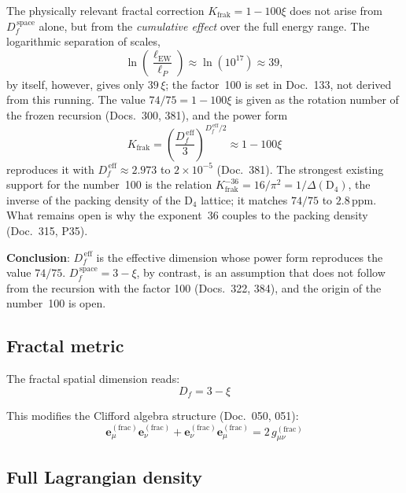 The physically relevant fractal correction $K_{\text{frak}} = 1 - 100\xi$
does not arise from $D_f^{\,\text{space}}$ alone, but from the
\emph{cumulative effect} over the full energy range. The logarithmic
separation of scales,
\begin{equation}
    \ln\!\left(\frac{\ell_{\text{EW}}}{\ell_P}\right)
    \approx \ln\!\left(10^{17}\right)
    \approx 39 ,
\end{equation}
by itself, however, gives only $39\,\xi$; the factor~100 is set in
Doc.~133, not derived from this running. The value $74/75 = 1-100\xi$ is
given as the rotation number of the frozen recursion (Docs.~300, 381), and
the power form
\begin{equation}
    K_{\text{frak}} = \left(\frac{D_f^{\,\text{eff}}}{3}\right)^{\!D_f^{\,\text{eff}}/2}
    \approx 1 - 100\xi
\end{equation}
reproduces it with $D_f^{\,\text{eff}} \approx 2.973$ to $2\times10^{-5}$
(Doc.~381). The strongest existing support for the number~100 is the
relation $K_{\text{frak}}^{-36} = 16/\pi^2 = 1/\Delta(\mathrm{D}_4)$, the
inverse of the packing density of the $\mathrm{D}_4$ lattice; it matches
$74/75$ to $2.8$\,ppm. What remains open is why the exponent~36 couples to
the packing density (Doc.~315, P35).

\textbf{Conclusion}: $D_f^{\,\text{eff}}$ is the effective dimension whose
power form reproduces the value $74/75$. $D_f^{\,\text{space}} = 3 - \xi$,
by contrast, is an assumption that does not follow from the recursion with
the factor 100 (Docs.~322, 384), and the origin of the number~100 is open.

\subsection{Fractal metric}

The fractal spatial dimension reads:
\begin{equation}
    D_f = 3 - \xi
\end{equation}

This modifies the Clifford algebra structure (Doc.~050, 051):
\begin{equation}
    \mathbf{e}_\mu^{(\mathrm{frac})} \mathbf{e}_\nu^{(\mathrm{frac})}
    + \mathbf{e}_\nu^{(\mathrm{frac})} \mathbf{e}_\mu^{(\mathrm{frac})}
    = 2\, g_{\mu\nu}^{(\mathrm{frac})}
\end{equation}

\subsection{Full Lagrangian density}

